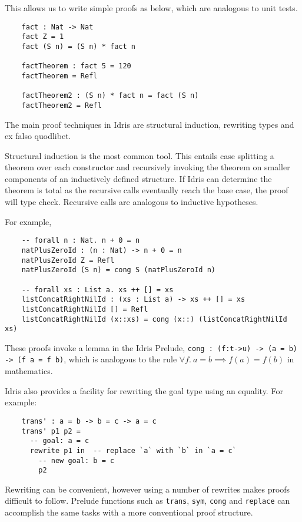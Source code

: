 \documentclass[]{report}
\begin{document}
This allows us to write simple proofs as below, which are analogous to unit tests.

\begin{verbatim}
	fact : Nat -> Nat
	fact Z = 1
	fact (S n) = (S n) * fact n
	
	factTheorem : fact 5 = 120
	factTheorem = Refl
	
	factTheorem2 : (S n) * fact n = fact (S n)
	factTheorem2 = Refl
\end{verbatim}

The main proof techniques in Idris are structural induction, rewriting types and ex falso quodlibet.

Structural induction is the most common tool. This entails case splitting a theorem over each constructor and recursively invoking the theorem on smaller components of an inductively defined structure. If Idris can determine the theorem is total as the recursive calls eventually reach the base case, the proof will type check. Recursive calls are analogous to inductive hypotheses.

For example,

\begin{verbatim}
	-- forall n : Nat. n + 0 = n
	natPlusZeroId : (n : Nat) -> n + 0 = n
	natPlusZeroId Z = Refl
	natPlusZeroId (S n) = cong S (natPlusZeroId n)
	
	-- forall xs : List a. xs ++ [] = xs
	listConcatRightNilId : (xs : List a) -> xs ++ [] = xs
	listConcatRightNilId [] = Refl
	listConcatRightNilId (x::xs) = cong (x::) (listConcatRightNilId xs)
\end{verbatim}

These proofs invoke a lemma in the Idris Prelude, \texttt{cong :\ (f:t->u) -> (a = b) -> (f a = f b)}, which is analogous to the rule $\forall f.~a=b\!\!\implies\!\! f(a)=f(b)$ in mathematics.

Idris also provides a facility for rewriting the goal type using an equality. For example:

\begin{verbatim}
	trans' : a = b -> b = c -> a = c
	trans' p1 p2 =
	  -- goal: a = c
	  rewrite p1 in  -- replace `a` with `b` in `a = c`
	    -- new goal: b = c
	    p2
\end{verbatim}

Rewriting can be convenient, however using a number of rewrites makes proofs difficult to follow. Prelude functions such as \texttt{trans}, \texttt{sym}, \texttt{cong} and \texttt{replace} can accomplish the same tasks with a more conventional proof structure.
\end{document}
